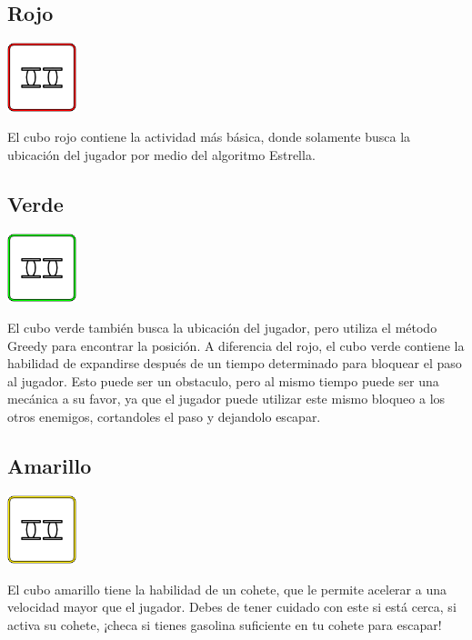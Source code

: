 \documentclass{article}
\begin{document}


\subsection{Rojo}

\includegraphics[width = 20mm]{_enem-rojo.png}

El cubo rojo contiene la actividad más básica, donde solamente busca la ubicación del jugador por medio del algoritmo Estrella.

\subsection{Verde}

\includegraphics[width = 20mm]{_enem-verde.png}


El cubo verde también busca la ubicación del jugador, pero utiliza el método Greedy para encontrar la posición.
A diferencia del rojo, el cubo verde contiene la habilidad de expandirse después de un tiempo determinado para bloquear
el paso al jugador. Esto puede ser un obstaculo, pero al mismo tiempo puede ser una mecánica a su favor, ya que
el jugador puede utilizar este mismo bloqueo a los otros enemigos, cortandoles el paso y dejandolo escapar.

\subsection{Amarillo}

\includegraphics[width = 20mm]{_enem-amarillo.png}


El cubo amarillo tiene la habilidad de un cohete, que le permite acelerar a una velocidad mayor que el jugador.
Debes de tener cuidado con este si está cerca, si activa su cohete, ¡checa si tienes gasolina suficiente en tu cohete para escapar!
\end{document}
